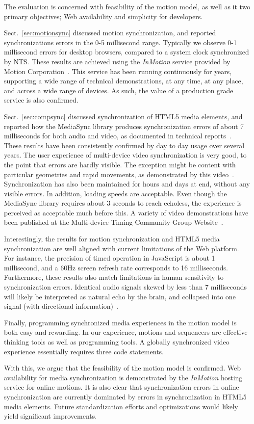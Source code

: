 The evaluation is concerned with feasibility of the motion model, as well as
it two primary objectives; Web availability and simplicity for developers.

Sect.~\ref{sec:motionsync} discussed motion synchronization, and reported
synchronizations errors in the 0-5 millisecond range. Typically we observe 0-1
millisecond errors for desktop browsers, compared to a system clock
synchronized by NTS. These results are achieved using the \emph{InMotion}
service provided by Motion Corporation~\cite{mcorp}. This service has been running
continuously for years, supporting a wide range of technical demonstrations,
at any time, at any place, and across a wide range of devices. As such, the
value of a production grade service is also confirmed.

Sect.~\ref{sec:compsync} discussed synchronization of HTML5 media
elements, and reported how the MediaSync library produces synchronization
errors of about 7 milliseconds for both audio and video, as documented in
technical reports~\cite{syncreport1,syncreport2}. These results have been consistently
confirmed by day to day usage over several years. The user experience of
multi-device video synchronization is very good, to the point that errors are
hardly visible. The exception might be content with particular geometries and
rapid movements, as demonstrated by this video~\cite{carneval}. Synchronization
has also been maintained for hours and days at end, without any visible
errors. In addition, loading speeds are acceptable. Even though the MediaSync
library requires about 3 seconds to reach echoless, the experience is
perceived as acceptable much before this. A variety of video demonstrations
have been published at the Multi-device Timing Community Group
Website~\cite{mtcg}.

Interestingly, the results for motion synchronization and HTML5 media
synchronization are well aligned with current limitations of the Web platform.
For instance, the precision of timed operation in JavaScript is about 1
millisecond, and a 60Hz screen refresh rate corresponds to 16 milliseconds.
Furthermore, these results also match limitations in human sensitivity to
synchronization errors. Identical audio signals skewed by less than 7
milliseconds will likely be interpreted as natural echo by the brain, and
collapsed into one signal (with directional information)~\cite{syncreport2}.

Finally, programming synchronized media experiences in the motion model is
both easy and rewarding. In our experience, motions and sequencers are
effective thinking tools as well as programming tools. A globally synchronized
video experience essentially requires three code statements.

With this, we argue that the feasibility of the motion model is confirmed. Web
availability for media synchronization is demonstrated by the \emph{InMotion} hosting
service for online motions. It is also clear that synchronization errors in
online synchronization are currently dominated by errors in synchronization in
HTML5 media elements. Future standardization efforts and optimizations would
likely yield significant improvements.
